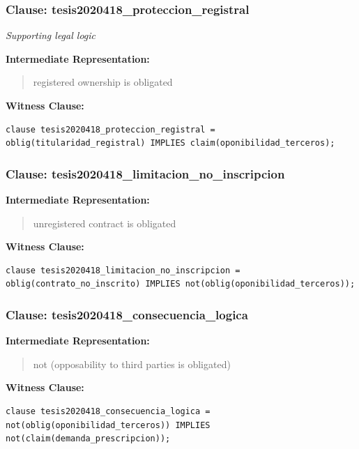 \documentclass[11pt,a4paper]{article}
\begin{document}
\subsubsection{Clause: tesis2020418\_proteccion\_registral}

\textit{Supporting legal logic}

\textbf{Intermediate Representation:}

\begin{quote}
registered ownership is obligated
\end{quote}

\textbf{Witness Clause:}

\begin{lstlisting}[style=witnessstyle, language=Witness]
clause tesis2020418_proteccion_registral = oblig(titularidad_registral) IMPLIES claim(oponibilidad_terceros);
\end{lstlisting}

\subsubsection{Clause: tesis2020418\_limitacion\_no\_inscripcion}

\textbf{Intermediate Representation:}

\begin{quote}
unregistered contract is obligated
\end{quote}

\textbf{Witness Clause:}

\begin{lstlisting}[style=witnessstyle, language=Witness]
clause tesis2020418_limitacion_no_inscripcion = oblig(contrato_no_inscrito) IMPLIES not(oblig(oponibilidad_terceros));
\end{lstlisting}

\subsubsection{Clause: tesis2020418\_consecuencia\_logica}

\textbf{Intermediate Representation:}

\begin{quote}
not (opposability to third parties is obligated)
\end{quote}

\textbf{Witness Clause:}

\begin{lstlisting}[style=witnessstyle, language=Witness]
clause tesis2020418_consecuencia_logica = not(oblig(oponibilidad_terceros)) IMPLIES not(claim(demanda_prescripcion));
\end{lstlisting}
\end{document}
